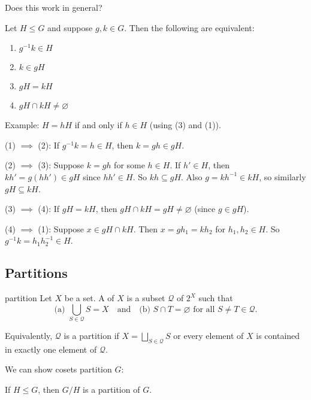 \documentclass[12pt,letterpaper]{report}
\begin{document}
Does this work in general?

\begin{prop}{}{}
  Let $H \leq G$ and suppose $g, k \in G$.
  Then the following are equivalent:
  \begin{enumerate}
    \item $g^{-1}k \in H$
    \item $k \in gH$
    \item $gH = kH$
    \item $gH \cap kH \neq \varnothing$
  \end{enumerate}
\end{prop}

Example: $H = hH$ if and only if $h \in H$ (using (3) and (1)).

\begin{thmproof}
  (1) $\implies$ (2): If $g^{-1}k = h \in H$, then $k = gh \in gH$.

  (2) $\implies$ (3): Suppose $k = gh$ for some $h \in H$.
  If $h' \in H$, then $kh' = g(hh') \in gH$ since $hh' \in H$.
  So $kh \subseteq gH$.
  Also $g = kh^{-1} \in kH$, so similarly $gH \subseteq kH$.

  (3) $\implies$ (4): If $gH = kH$, then $gH \cap kH = gH \neq \varnothing$ (since $g \in gH$).

  (4) $\implies$ (1): Suppose $x \in gH \cap kH$.
  Then $x = gh_1 = kh_2$ for $h_1, h_2 \in H$.
  So $g^{-1}k = h_1h_2^{-1} \in H$.
\end{thmproof}

\pagebreak
\subsection{Partitions}

\begin{defn}{partition}{}
  Let $X$ be a set.
  A  of $X$ is a subset $\mathcal{Q}$ of $2^X$ such that
  \[
    \text{(a) } \bigcup_{S \in \mathcal{Q}} S = X \quad \text{and} \quad
    \text{(b) } S \cap T = \varnothing \text{ for all } S \neq T \in \mathcal{Q}.
  \]
\end{defn}

Equivalently, $\mathcal{Q}$ is a partition if $X = \bigsqcup_{S \in \mathcal{Q}} S$ or every element
of $X$ is contained in exactly one element of $\mathcal{Q}$.

We can show cosets partition $G$:

\begin{cor}{}{}
  If $H \leq G$, then $G/H$ is a partition of $G$.
\end{cor}
\end{document}
